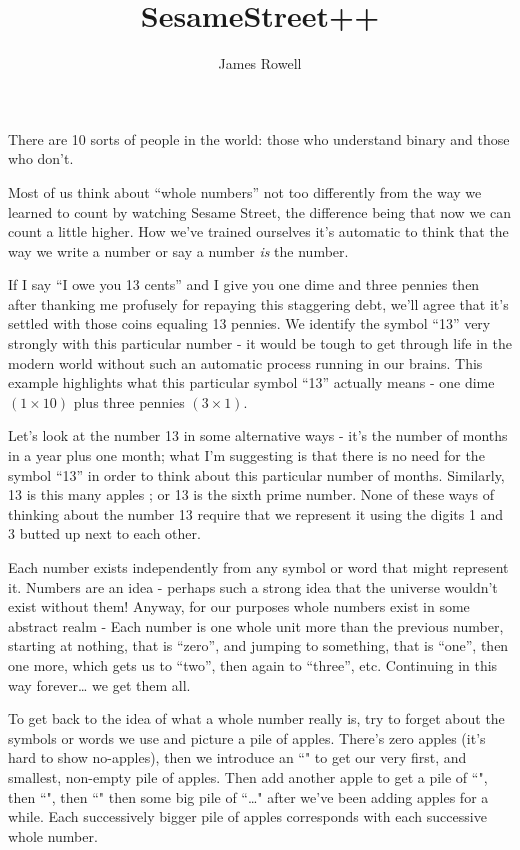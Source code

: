 \documentclass{article}
\title{SesameStreet++}
\author{James Rowell}
\begin{document}
\maketitle
\begin{em}
\small{}There are 10 sorts of people in the world: those who understand binary and those who don't.
\end{em}
\normalsize
\bigskip

Most of us think about ``whole numbers'' not too differently from the way
we learned to count by watching Sesame Street,
the difference being that now we can count a little higher.
How we've trained ourselves it's automatic to think that the way
we write a number or say a number \emph{is} the number.

If I say ``I owe you 13 cents'' and I give you one dime and three pennies then 
after thanking me profusely for repaying this staggering debt,
we'll agree that it's settled with those coins equaling 13 pennies. 
We identify the symbol ``13'' very strongly with this particular number - it would 
be tough to get through life in the modern world without such an automatic process
running in our brains. 
This example highlights what this particular symbol ``13'' actually means -
one dime $(1 \times 10)$ plus three pennies $(3 \times 1)$.

Let's look at the number 13 in some alternative ways - it's the 
number of months in a year plus one month;
what I'm suggesting is that there is no need for the symbol ``13'' in order
to think about this particular number of months. Similarly, 13 is this many apples
\faApple{}\faApple{}\faApple{}\faApple{}\faApple{}\faApple{}\faApple{}\faApple{}\faApple{}\faApple{}\faApple{}\faApple{}\faApple{};
or 13 is the sixth prime number. None of these ways of thinking about the number
13 require that we represent it using the digits 1 and 3 butted up next to each other.

Each number exists independently from any symbol or word that might represent it.
Numbers are an idea - perhaps such a strong idea that the universe wouldn't exist without them!
Anyway, for our purposes whole numbers exist in some abstract realm -
Each number is one whole unit more than the previous number,
starting at nothing, that is ``zero'', and jumping to something, that is ``one'',
then one more, which gets us to ``two'',
then again to ``three'', etc. Continuing in this way forever\dots{} we get them all.

To get back to the idea of what a whole number really is,
try to forget about the symbols or words we use and picture a pile of apples.
There's zero apples (it's hard to show no-apples),
then we introduce an ``\faApple{}" to get our very first,
and smallest, non-empty pile of apples.
Then add another apple to get a pile of ``\faApple{}\faApple{}",
then ``\faApple{}\faApple{}\faApple{}",
then ``\faApple{}\faApple{}\faApple{}\faApple{}"
then some big pile of
``\faApple{}\faApple{}\faApple{}\faApple{}\faApple{}\dots{}\faApple{}\faApple{}\faApple{}"
after we've been adding apples for a while.
Each successively bigger pile of apples corresponds with each successive whole number.
\end{document}
